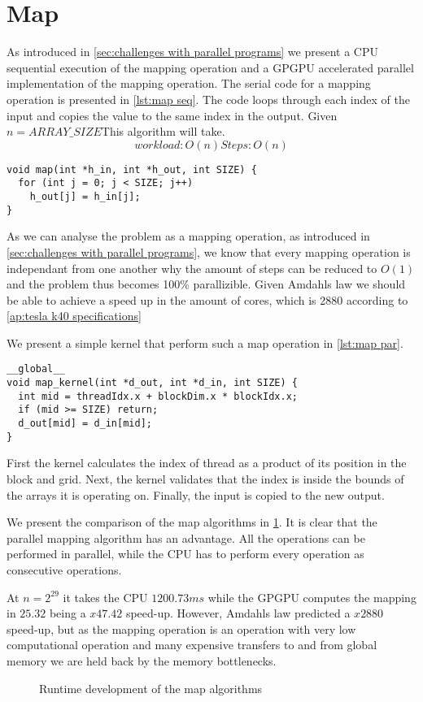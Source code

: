 \section{Map}
\label{sec:map}

As introduced in \cref{sec:challenges with parallel programs} we present a CPU sequential execution of the mapping operation and a GPGPU accelerated parallel implementation of the mapping operation.
The serial code for a mapping operation is presented in \cref{lst:map seq}.
The code loops through each index of the input and copies the value to the same index in the output.
Given $n=ARRAY\_SIZE$This algorithm will take.
\begin{equation*}
workload: O(n)
Steps: O(n)
\end{equation*}

\begin{lstlisting}[caption={Serial map}, label={lst:map seq}]
void map(int *h_in, int *h_out, int SIZE) {
  for (int j = 0; j < SIZE; j++) 
    h_out[j] = h_in[j];
}
\end{lstlisting}

As we can analyse the problem as a mapping operation, as introduced in \cref{sec:challenges with parallel programs}, we know that every mapping operation is independant from one another why the amount of steps can be reduced to $O(1)$ and the problem thus becomes 100\% parallizible.
Given Amdahls law we should be able to achieve a speed up in the amount of cores, which is 2880 according to \cref{ap:tesla k40 specifications}

We present a simple kernel that perform such a map operation in \cref{lst:map par}.

\begin{lstlisting}[caption={Map kernel}, label={lst:map par}]
__global__ 
void map_kernel(int *d_out, int *d_in, int SIZE) {
  int mid = threadIdx.x + blockDim.x * blockIdx.x;
  if (mid >= SIZE) return;
  d_out[mid] = d_in[mid];
}
\end{lstlisting}

First the kernel calculates the index of thread as a product of its position in the block and grid.
Next, the kernel validates that the index is inside the bounds of the arrays it is operating on.
Finally, the input is copied to the new output.

We present the comparison of the map algorithms in \cref{fig:map plot}.
It is clear that the parallel mapping algorithm has an advantage.
All the operations can be performed in parallel, while the CPU has to perform every operation as consecutive operations.

At $n = 2^{29}$ it takes the CPU $1200.73 ms$ while the GPGPU computes the mapping in $25.32$ being a $x47.42$ speed-up.
However, Amdahls law predicted a $x2880$ speed-up, but as the mapping operation is an operation with very low computational operation and many expensive transfers to and from global memory we are held back by the memory bottlenecks.

\begin{figure}[htb]
  \centering
  
  \caption{Runtime development of the map algorithms}
  \label{fig:map plot}
\end{figure}
